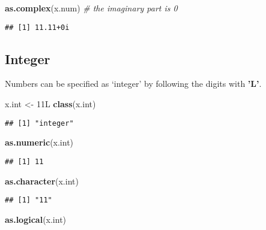 \documentclass[
  12pt,
]{article}
\newenvironment{Shaded}{\begin{snugshade}}{\end{snugshade}}
\newcommand{\CommentTok}[1]{\textcolor[rgb]{0.56,0.35,0.01}{\textit{#1}}}
\newcommand{\DataTypeTok}[1]{\textcolor[rgb]{0.13,0.29,0.53}{#1}}
\newcommand{\DecValTok}[1]{\textcolor[rgb]{0.00,0.00,0.81}{#1}}
\newcommand{\FunctionTok}[1]{\textcolor[rgb]{0.13,0.29,0.53}{\textbf{#1}}}
\newcommand{\NormalTok}[1]{#1}
\newcommand{\OtherTok}[1]{\textcolor[rgb]{0.56,0.35,0.01}{#1}}
\begin{document}
\begin{Shaded}
\begin{Highlighting}[]
\FunctionTok{as.complex}\NormalTok{(x.num)  }\CommentTok{\# the imaginary part is 0}
\end{Highlighting}
\end{Shaded}

\begin{verbatim}
## [1] 11.11+0i
\end{verbatim}

\newpage
\subsection{Integer}
\label{sec:VAR-integer}

Numbers can be specified as `integer' by following the digits with
\textbf{'L'}.

\begin{Shaded}
\begin{Highlighting}[]
\NormalTok{x.int }\OtherTok{\textless{}{-}} \DecValTok{11}\DataTypeTok{L}  
\FunctionTok{class}\NormalTok{(x.int)}
\end{Highlighting}
\end{Shaded}

\begin{verbatim}
## [1] "integer"
\end{verbatim}

\begin{Shaded}
\begin{Highlighting}[]
\FunctionTok{as.numeric}\NormalTok{(x.int)}
\end{Highlighting}
\end{Shaded}

\begin{verbatim}
## [1] 11
\end{verbatim}

\begin{Shaded}
\begin{Highlighting}[]
\FunctionTok{as.character}\NormalTok{(x.int)}
\end{Highlighting}
\end{Shaded}

\begin{verbatim}
## [1] "11"
\end{verbatim}

\begin{Shaded}
\begin{Highlighting}[]
\FunctionTok{as.logical}\NormalTok{(x.int)}
\end{Highlighting}
\end{Shaded}
\end{document}

